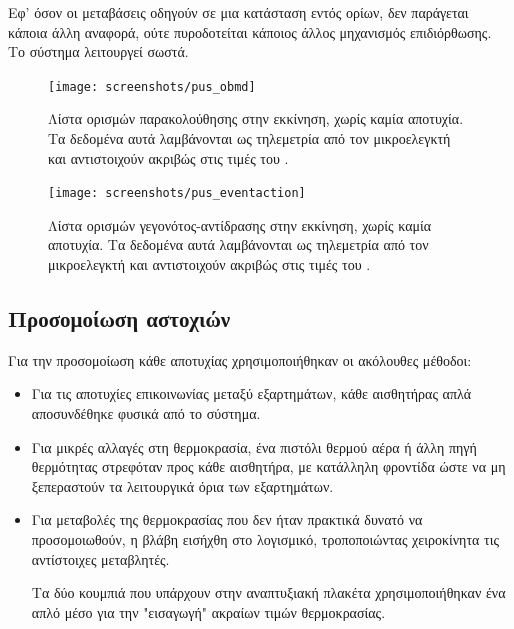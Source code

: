 \documentclass[a4paper,nobib]{tufte-book}
\begin{document}
Εφ' όσον οι μεταβάσεις οδηγούν σε μια κατάσταση εντός ορίων, δεν παράγεται κάποια άλλη αναφορά, ούτε πυροδοτείται κάποιος άλλος μηχανισμός επιδιόρθωσης. Το σύστημα λειτουργεί σωστά.

\begin{figure}[h]
	\texttt{[image: screenshots/pus\_obmd]}
	\caption[Λίστα ορισμών παρακολούθησης στην εκκίνηση, χωρίς καμία αποτυχία]{Λίστα ορισμών παρακολούθησης στην εκκίνηση, χωρίς καμία αποτυχία. Τα δεδομένα αυτά λαμβάνονται ως τηλεμετρία από τον μικροελεγκτή και αντιστοιχούν ακριβώς στις τιμές του .}
	\label{fig:pus_obmd}
\end{figure}

\begin{figure}[h]
	\texttt{[image: screenshots/pus\_eventaction]}
	\caption[Λίστα ορισμών γεγονότος-αντίδρασης]{Λίστα ορισμών γεγονότος-αντίδρασης στην εκκίνηση, χωρίς καμία αποτυχία. Τα δεδομένα αυτά λαμβάνονται ως τηλεμετρία από τον μικροελεγκτή και αντιστοιχούν ακριβώς στις τιμές του .}
	\label{fig:pus_eventaction}
\end{figure}

\FloatBarrier
\subsection{Προσομοίωση αστοχιών}

Για την προσομοίωση κάθε αποτυχίας χρησιμοποιήθηκαν οι ακόλουθες μέθοδοι:
\begin{itemize}
	\item Για τις αποτυχίες επικοινωνίας μεταξύ εξαρτημάτων, κάθε αισθητήρας απλά αποσυνδέθηκε φυσικά από το σύστημα.
	\item Για μικρές αλλαγές στη θερμοκρασία, ένα πιστόλι θερμού αέρα ή άλλη πηγή θερμότητας στρεφόταν προς κάθε αισθητήρα, με κατάλληλη φροντίδα ώστε να μη ξεπεραστούν τα λειτουργικά όρια των εξαρτημάτων.
	\item Για μεταβολές της θερμοκρασίας που δεν ήταν πρακτικά δυνατό να προσομοιωθούν, η βλάβη εισήχθη στο λογισμικό, τροποποιώντας χειροκίνητα τις αντίστοιχες μεταβλητές.
	
	Τα δύο κουμπιά που υπάρχουν στην αναπτυξιακή πλακέτα χρησιμοποιήθηκαν ένα απλό μέσο για την "εισαγωγή" ακραίων τιμών θερμοκρασίας.
\end{itemize}
\end{document}
